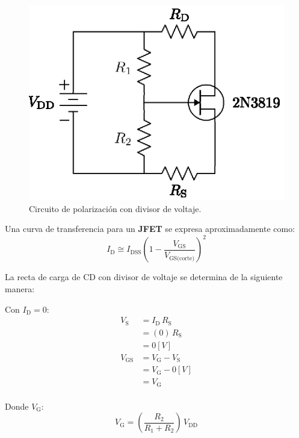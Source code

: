 \documentclass[letter,twoside,11pt]{article}
\begin{document}
\begin{figure}[!h]
\centering
\includegraphics[scale=1.0]{figura1.eps}
\caption{Circuito de polarización con divisor de voltaje.}
\label{circuito1}
\end{figure}

Una curva de transferencia para un \textbf{JFET} se expresa aproximadamente
como:
\begin{equation*}
    I_{\text{D}} \cong I_{\text{DSS}}
    \left(1-\frac{V_{\text{GS}}}{V_{\text{GS(corte)}}}\right)^2
\end{equation*}

La recta de carga de CD con divisor de voltaje se determina de la siguiente
manera:

Con $I_\text{D} = 0$:
\begin{equation*}
    \begin{split}
        V_\text{S} &= I_{\text{D}}\,R_{\text{S}}\\
                   &= (0)\,R_{\text{S}}\\
                   &= 0[V]\\
        V_\text{GS} &= V_{\text{G}} - V_{\text{S}}\\
                    &= V_{\text{G}} - 0[V]\\
                    &= V_{\text{G}}\\
    \end{split}
\end{equation*}

Donde $V_{\text{G}}$:
\begin{equation*}
    V_{\text{G}} = \left(\frac{R_2}{R_1+R_2}\right)\,V_{\text{DD}}
\end{equation*}
\end{document}
